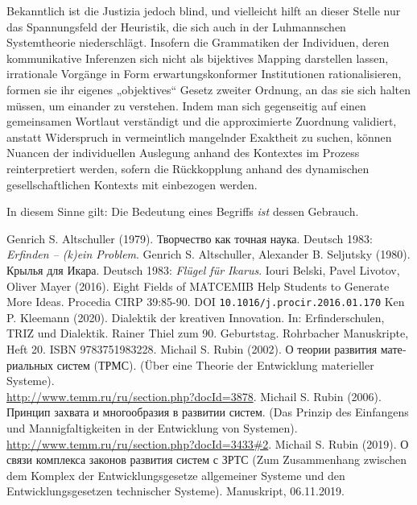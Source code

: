 \documentclass[a4paper,11pt]{article}
\begin{document}
Bekanntlich ist die Justizia jedoch blind, und vielleicht hilft an dieser
Stelle nur das Spannungsfeld der Heuristik, die sich auch in der Luhmannschen
Systemtheorie niederschlägt. Insofern die Grammatiken der Individuen, deren
kommunikative Inferenzen sich nicht als bijektives Mapping darstellen lassen,
irrationale Vorgänge in Form erwartungskonformer Institutionen
rationalisieren, formen sie ihr eigenes „objektives“ Gesetz zweiter Ordnung,
an das sie sich halten müssen, um einander zu verstehen. Indem man sich
gegenseitig auf einen gemeinsamen Wortlaut verständigt und die approximierte
Zuordnung validiert, anstatt Widerspruch in vermeintlich mangelnder Exaktheit
zu suchen, können Nuancen der individuellen Auslegung anhand des Kontextes im
Prozess reinterpretiert werden, sofern die Rückkopplung anhand des dynamischen
gesellschaftlichen Kontexts mit einbezogen werden.

In diesem Sinne gilt: Die Bedeutung eines Begriffs \emph{ist} dessen Gebrauch.

\begin{thebibliography}{yyy}
 Genrich S. Altschuller (1979).
  \foreignlanguage{russian}{Творчество как точная наука}.  Deutsch 1983:
  \emph{Erfinden -- (k)ein Problem}.
 Genrich S. Altschuller, Alexander B. Seljutsky
  (1980). \foreignlanguage{russian}{Крылья для Икара}. Deutsch 1983:
  \emph{Flügel für Ikarus}.
 Iouri Belski, Pavel Livotov, Oliver Mayer (2016). Eight
  Fields of MATCEMIB Help Students to Generate More Ideas. Procedia CIRP
  39:85-90.  DOI \texttt{10.1016/j.procir.2016.01.170}
 Ken P. Kleemann (2020). Dialektik der kreativen
  Innovation.  In: Erfinderschulen, TRIZ und Dialektik. Rainer Thiel zum
  90. Geburtstag.  Rohrbacher Manuskripte, Heft 20. ISBN 9783751983228.
 Michail S. Rubin (2002).  \foreignlanguage{russian}{О
  теории развития материальных систем (ТРМС).} (Über eine Theorie der
  Entwicklung materieller  Systeme). \\
  \url{http://www.temm.ru/ru/section.php?docId=3878}.
 Michail S. Rubin (2006). \foreignlanguage{russian}{Принцип
  захвата и многообразия в развитии систем.} (Das Prinzip des Einfangens und
  Mannigfaltigkeiten in der Entwicklung von Systemen).\\
  \url{http://www.temm.ru/ru/section.php?docId=3433#2}.
 Michail S. Rubin (2019).  \foreignlanguage{russian}{О
  связи комплекса законов развития систем с ЗРТС} (Zum Zusammenhang zwischen
  dem Komplex der Entwicklungsgesetze allgemeiner Systeme und den
  Entwicklungsgesetzen technischer Systeme).  Manuskript, 06.11.2019.
\end{thebibliography}
\end{document}
